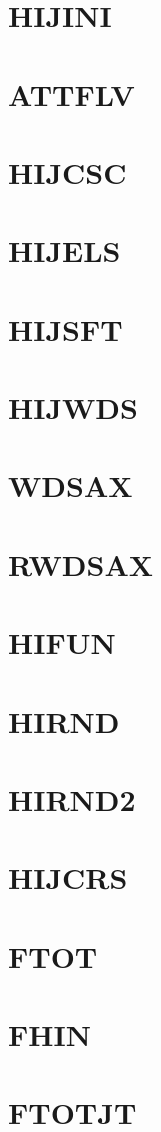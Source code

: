 \documentclass[10pt,UTF8]{ctexbook}
\begin{document}
\section{HIJINI}
\section{ATTFLV}
\section{HIJCSC}
\section{HIJELS}
\section{HIJSFT}
\section{HIJWDS}
\section{WDSAX}
\section{RWDSAX}
\section{HIFUN}
\section{HIRND}
\section{HIRND2}
\section{HIJCRS}
\section{FTOT}
\section{FHIN}
\section{FTOTJT}
\end{document}
